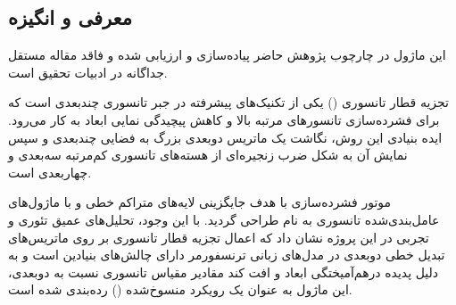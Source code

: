 \subsection{معرفی و انگیزه}
این ماژول در چارچوب پژوهش حاضر پیاده‌سازی و ارزیابی شده و فاقد مقاله مستقل جداگانه در ادبیات تحقیق است.

تجزیه قطار تانسوری () یکی از تکنیک‌های پیشرفته در جبر تانسوری چندبعدی است که برای فشرده‌سازی تانسورهای مرتبه بالا و کاهش پیچیدگی نمایی ابعاد به کار می‌رود. ایده بنیادی این روش، نگاشت یک ماتریس دوبعدی بزرگ به فضایی چندبعدی و سپس نمایش آن به شکل ضرب زنجیره‌ای از هسته‌های تانسوری کم‌مرتبه سه‌بعدی و چهاربعدی است.

موتور فشرده‌سازی  با هدف جایگزینی لایه‌های متراکم خطی  و  با ماژول‌های عامل‌بندی‌شده تانسوری به نام  طراحی گردید. با این وجود، تحلیل‌های عمیق تئوری و تجربی در این پروژه نشان داد که اعمال تجزیه قطار تانسوری بر روی ماتریس‌های تبدیل خطی دوبعدی در مدل‌های زبانی ترنسفورمر دارای چالش‌های بنیادین است و به دلیل پدیده درهم‌آمیختگی ابعاد و افت کند مقادیر مقیاس تانسوری نسبت به  دوبعدی، این ماژول به عنوان یک رویکرد منسوخ‌شده () رده‌بندی شده است.
